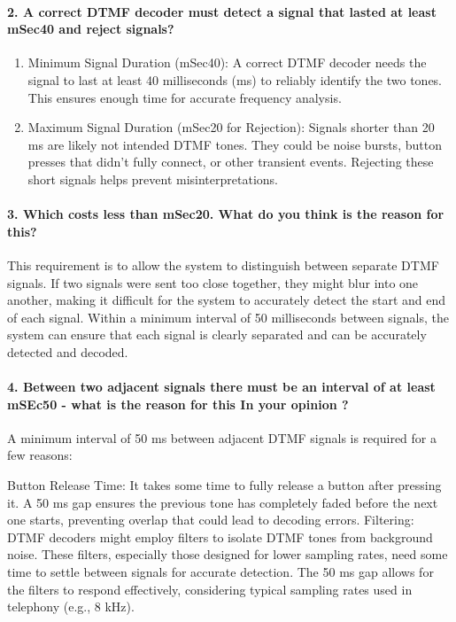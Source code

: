 \documentclass[letterpaper, 12pt]{article}
\begin{document}
\paragraph{2. A correct DTMF decoder must detect a signal that lasted at least mSec40 and reject signals?} 
\begin{enumerate}
    \item Minimum Signal Duration (mSec40): A correct DTMF decoder needs the signal to last at least 40 milliseconds (ms) to reliably identify the two tones. This ensures enough time for accurate frequency analysis.
    \item Maximum Signal Duration (mSec20 for Rejection): Signals shorter than 20 ms are likely not intended DTMF tones. They could be noise bursts, button presses that didn't fully connect, or other transient events. Rejecting these short signals helps prevent misinterpretations.
\end{enumerate}

\paragraph{3. Which costs less than mSec20. What do you think is the reason for this?} 
This requirement is to allow the system to distinguish between separate DTMF signals. If two signals were sent too close together, they might blur into one another, making it difficult for the system to accurately detect the start and end of each signal. Within a minimum interval of 50 milliseconds between signals, the system can ensure that each signal is clearly separated and can be accurately detected and decoded.

\paragraph{4. Between two adjacent signals there must be an interval of at least mSEc50 - what is the reason for this In your opinion ?} A minimum interval of 50 ms between adjacent DTMF signals is required for a few reasons:

Button Release Time: It takes some time to fully release a button after pressing it. A 50 ms gap ensures the previous tone has completely faded before the next one starts, preventing overlap that could lead to decoding errors.
Filtering: DTMF decoders might employ filters to isolate DTMF tones from background noise. These filters, especially those designed for lower sampling rates, need some time to settle between signals for accurate detection. The 50 ms gap allows for the filters to respond effectively, considering typical sampling rates used in telephony (e.g., 8 kHz).
\end{document}
